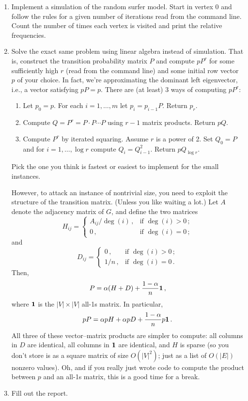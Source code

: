 \documentclass{tufte-handout}
\begin{document}
\begin{enumerate}
\item Implement a simulation of the random surfer model. 
  Start in
  vertex 0 and follow the rules for a given number of iterations read
  from the command line. Count the number of times each vertex is
  visited and print the relative frequencies.
\item Solve the exact same problem using linear algebra instead of
  simulation.
  That is, construct the transition probability matrix $P$ and
  compute $pP^r$ for some sufficiently high $r$ (read from the command
  line) and some initial row vector $p$ of your choice.
  In fact, we're approximating the dominant left eigenvector, i.e., a
  vector satisfying $pP= p$.
  There are (at least) 3 ways of computing $pP^r$:
  \begin{enumerate} 
  \item Let $p_0= p$. For each $i=1,\ldots, m$ let $p_i = p_{i-1}
    P$. Return $p_r$.
  \item Compute $Q = P^r = P\cdot P \cdots P$ using $r-1$ matrix products.
    Return $pQ$.
  \item Compute $P^r$ by iterated squaring. Assume $r$ is a power of
    2. Set $Q_0 = P$ and for $i=1,\ldots,\log r$ compute $Q_i =
    Q_{i-1}^2$. Return $pQ_{\log r}$. 
  \end{enumerate}
  Pick the one you think is fastest or easiest to implement for the
  small instances.

  However, to attack an instance of nontrivial size, you need to
  exploit the structure of the transition matrix.
  (Unless you like waiting a lot.)
  Let $A$ denote the adjacency matrix of $G$, and define the two
  matrices
  \[
  H_{ij} =
  \begin{cases}
    A_{ij} / \deg(i)\,, & \text{if } \deg(i) > 0\,; \\
    0\,, & \text{if } \deg(i) = 0 \,;   
  \end{cases}
  \]
  and
  \[
  D_{ij} =
  \begin{cases}
    0\,, & \text{if } \deg(i) > 0\,; \\
    1 / n\,, & \text{if } \deg(i) = 0\,.
  \end{cases}
  \]
  Then,
  \[ P = \alpha(H + D) + \frac{1-\alpha}{n} \bf 1\,,\]
  where $\bf 1$ is the $|V|\times |V|$ all-1s matrix.
  In particular,
  \[pP = \alpha p H + \alpha p D + \frac{1-\alpha}{n} p \bf 1\,.\] All
  three of these vector--matrix products are simpler to compute: all
  columns in $D$ are identical, all columns in $\bf 1$ are identical,
  and $H$ is sparse (so you don't store is as a square matrix of size
  $O(|V|^2)$; just as a list of $O(|E|)$ nonzero values).
  Oh, and if you really just wrote code to compute the product
  between $p$ and an all-1s matrix, this is a good time for a break.
\item Fill out the report.
\end{enumerate}
\end{document}

